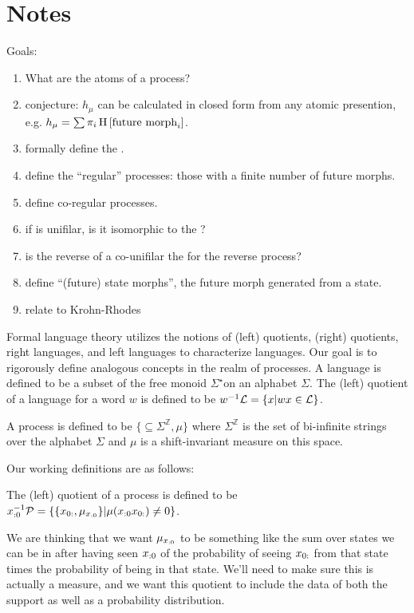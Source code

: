 \documentclass[prl,twocolumn,showpacs,superscriptaddress,preprintnumbers,floatfix]{revtex4-1}
\theoremstyle{plain}    \newtheorem{Lem}{Lemma}
\theoremstyle{plain}    \newtheorem*{ProLem}{Proof}
\theoremstyle{plain}    \newtheorem{Cor}{Corollary}
\theoremstyle{plain}    \newtheorem*{ProCor}{Proof}
\theoremstyle{plain}    \newtheorem{The}{Theorem}
\theoremstyle{plain}    \newtheorem*{ProThe}{Proof}
\theoremstyle{plain}    \newtheorem{Prop}{Proposition}
\theoremstyle{plain}    \newtheorem*{ProProp}{Proof}
\theoremstyle{plain}    \newtheorem*{Conj}{Conjecture}
\theoremstyle{plain}    \newtheorem*{Rem}{Remark}
\theoremstyle{plain}    \newtheorem{Def}{Definition}
\theoremstyle{plain}    \newtheorem*{Not}{Notation}
\begin{document}
\section{Notes}

Goals:
\begin{enumerate}
  \item What are the atoms of a process?
  \item conjecture: $h_\mu$ can be calculated in closed form from any atomic
    presention, e.g. $h_\mu = \sum \pi_i \operatorname{H}\left[\textrm{future morph}_i\right]$.
  \item formally define the \eT.
  \item define the ``regular'' processes: those with a finite number of future
    morphs.
  \item define co-regular processes.
  \item if \eT is unifilar, is it isomorphic to the \eM?
  \item is the reverse of a co-unifilar \eM the \eM for the reverse
    process?
  \item define ``(future) state morphs'', the future morph generated from a
    state.
  \item relate to Krohn-Rhodes
\end{enumerate}

Formal language theory utilizes the notions of (left) quotients, (right)
quotients, right languages, and left languages to characterize languages. Our
goal is to rigorously define analogous concepts in the realm of processes. A
language \Language is defined to be a subset of the free monoid
$\Sigma^{\star}$on an alphabet $\Sigma$. The (left) quotient of a language
\Language for a word $w$ is defined to be $w^{-1}\mathcal{L} = \{ x | wx \in
\mathcal{L} \}$.

A process \Process is defined to be $\{\subseteq \Sigma^{\mathbb{Z}}, \mu\}$
where $\Sigma^{\mathbb{Z}}$ is the set of bi-infinite strings over the alphabet
$\Sigma$ and $\mu$ is a shift-invariant measure on this space.

Our working definitions are as follows:

The (left) quotient of a process \Process is defined to be ${x}_{:0}^{-1} \mathcal{P} =
\{ \{ {x}_{0:}, \mu_{{x}_{:0}} \} | \mu({x}_{:0} {x}_{0:}) \neq 0 \}$.

We are thinking that we want $\mu_{{x}_{:0}}$ to be something like the sum over
states we can be in after having seen ${x}_{:0}$ of the probability of seeing
${x}_{0:}$ from that state times the probability of being in that state.
We'll need to make sure this is actually a measure, and we want this quotient to
include the data of both the support as well as a probability distribution.
\end{document}
